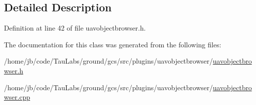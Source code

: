 \subsection{\-Detailed \-Description}


\-Definition at line 42 of file uavobjectbrowser.\-h.



\-The documentation for this class was generated from the following files\-:\begin{DoxyCompactItemize}
\item 
/home/jb/code/\-Tau\-Labs/ground/gcs/src/plugins/uavobjectbrowser/\hyperlink{uavobjectbrowser_8h}{uavobjectbrowser.\-h}\item 
/home/jb/code/\-Tau\-Labs/ground/gcs/src/plugins/uavobjectbrowser/\hyperlink{uavobjectbrowser_8cpp}{uavobjectbrowser.\-cpp}\end{DoxyCompactItemize}
